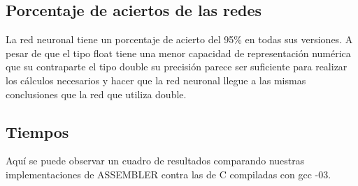 \subsection{Porcentaje de aciertos de las redes}

La red neuronal tiene un porcentaje de acierto del 95\% en todas sus versiones. A pesar de que el tipo float tiene una menor capacidad de representación numérica que su contraparte el tipo double su precisión parece ser suficiente para realizar los cálculos necesarios y hacer que la red neuronal llegue a las mismas conclusiones que la red que utiliza double.


\subsection{Tiempos}

Aquí se puede observar un cuadro de resultados comparando nuestras implementaciones de ASSEMBLER contra las de C compiladas con gcc -03.

\begin{center}
\end{center}
